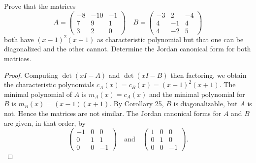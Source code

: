 \documentclass[10pt]{amsart}
\begin{document}
\begin{thm}
  \label{Ex4}
  Prove that the matrices 
  $$
  A = \begin{pmatrix}
    -8 & -10 & -1\\
    7 & 9 & 1\\
    3 & 2 & 0
  \end{pmatrix}
  \quad
  B = \begin{pmatrix}
    -3 & 2 & -4\\
    4 & -1 & 4\\
    4 & -2 & 5
  \end{pmatrix}
  $$
  both have $(x-1)^2(x+1)$ as characteristic polynomial but that one can be diagonalized and the other cannot.
  Determine the Jordan canonical form for both matrices.
  \begin{proof}
    Computing $\det(xI - A)$ and $\det(xI - B)$ then factoring, we obtain the characteristic polynomials $c_A(x) = c_B(x) = (x-1)^2(x+1)$.
    The minimal polynomial of $A$ is $m_A(x) = c_A(x)$ and the minimal polynomial for $B$ is $m_B(x) = (x-1)(x+1)$.
    By Corollary 25, $B$ is diagonalizable, but $A$ is not.  
    Hence the matrices are not similar.
    The Jordan canonical forms for $A$ and $B$ are given, in that order, by
    $$
    \begin{pmatrix}
      -1 & 0 & 0\\
      0 & 1 & 1\\
      0 & 0 & -1
    \end{pmatrix}
    \quad \text{and} \quad
    \begin{pmatrix}
      1 & 0 & 0\\
      0 & 1 & 0\\
      0 & 0 & -1
    \end{pmatrix}.
    $$
  \end{proof}
\end{thm}
\end{document}
